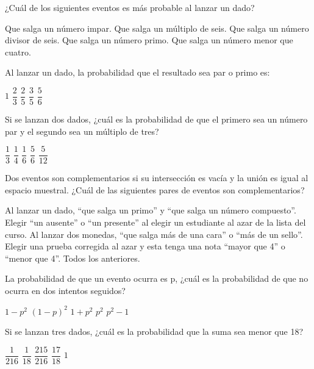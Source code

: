 \documentclass[sin nombre]{srs2}
\begin{document}
\vspace*{20pt}
\begin{preguntas}
\pregunta ¿Cuál de los siguientes eventos es más probable al lanzar un dado?
\begin{alternativas}
\alternativa Que salga un número impar.
\alternativa Que salga un múltiplo de seis.
\alternativa Que salga un número divisor de seis.
\alternativa Que salga un número primo.
\alternativa Que salga un número menor que cuatro.
\end{alternativas}

\pregunta Al lanzar un dado, la probabilidad que el resultado sea par o primo es:
\begin{alternativas}
\alternativa $1$
\alternativa $\dfrac{2}{3}$
\alternativa $\dfrac{2}{5}$
\alternativa $\dfrac{3}{5}$
\alternativa $\dfrac{5}{6}$
\end{alternativas}

\pregunta Si se lanzan dos dados, ¿cuál es la probabilidad de que el primero sea un número par y el segundo sea un múltiplo de tres?
\begin{alternativas}
\alternativa $\dfrac{1}{3}$
\alternativa $\dfrac{1}{4}$
\alternativa $\dfrac{1}{6}$
\alternativa $\dfrac{5}{6}$
\alternativa $\dfrac{5}{12}$
\end{alternativas}

\pregunta Dos eventos son complementarios si su intersección es vacía y la unión es igual al espacio muestral. ¿Cuál de las siguientes pares de eventos son complementarios?
\begin{alternativas}
\alternativa Al lanzar un dado, “que salga un primo” y “que salga un número compuesto”.
\alternativa Elegir “un ausente” o “un presente” al elegir un estudiante al azar de la lista del curso.
\alternativa Al lanzar dos monedas, “que salga más de una cara” o “más de un sello”.
\alternativa Elegir una prueba corregida al azar y esta tenga una nota “mayor que 4” o “menor que 4”.
\alternativa Todos los anteriores.
\end{alternativas}

\pregunta La probabilidad de que un evento ocurra es p, ¿cuál es la probabilidad de que no ocurra en dos intentos seguidos?
\begin{alternativas}
\alternativa $1 - p^2$
\alternativa $\left(1 - p\right)^2$
\alternativa $1 + p^2$
\alternativa $p^2$
\alternativa $p^2 - 1$
\end{alternativas}

\pregunta Si se lanzan tres dados, ¿cuál es la probabilidad que la suma sea menor que 18?
\begin{alternativas}
\alternativa $\dfrac{1}{216}$
\alternativa $\dfrac{1}{18}$
\alternativa $\dfrac{215}{216}$
\alternativa $\dfrac{17}{18}$
\alternativa $1$
\end{alternativas}


\end{preguntas}
\end{document}
